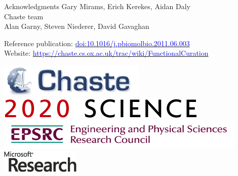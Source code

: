 \documentclass[t,xcolor={usenames,dvipsnames}]{beamer}
\newcommand{\myhref}[2]{\href{#1}{\textcolor{Blue}{#2}}}
\newcommand{\myurl}[1]{\myhref{#1}{#1}}
\newcommand{\doi}[1]{\myhref{http://dx.doi.org/#1}{doi:#1}}
\begin{document}
\begin{frame}{Acknowledgments}
Gary Mirams, Erich Kerekes, Aidan Daly\\
Chaste team\\
Alan Garny, Steven Niederer, David Gavaghan

Reference publication: \doi{10.1016/j.pbiomolbio.2011.06.003}\\
Website: \myurl{https://chaste.cs.ox.ac.uk/trac/wiki/FunctionalCuration}

\begin{center}
\includegraphics[scale=.9]{chaste-266x60}\\ \vspace{.3cm}
\includegraphics[scale=.7]{logo2020science}\\ \vspace{.4cm}
\includegraphics[width=.55\textwidth]{EPSRC1RGBLO} \hspace{.1cm}
\includegraphics[scale=.55]{logo_msr}
\end{center}
\end{frame}


\appendix
\end{document}

